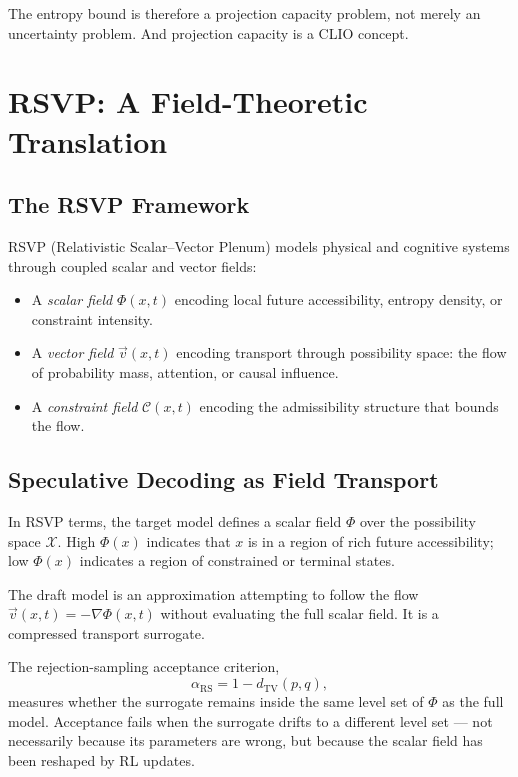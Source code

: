 \documentclass[11pt, a4paper, openany]{book}
\theoremstyle{plain}
\theoremstyle{definition}
\theoremstyle{remark}
\newcommand{\TV}{d_{\mathrm{TV}}}
\newcommand{\RS}{\alpha_{\mathrm{RS}}}
\begin{document}
The entropy bound is therefore a projection capacity problem,
not merely an uncertainty problem.
And projection capacity is a CLIO concept.

\chapter{RSVP: A Field-Theoretic Translation}
\label{ch:rsvp}

\section{The RSVP Framework}

RSVP (Relativistic Scalar--Vector Plenum) models physical and cognitive
systems through coupled scalar and vector fields:
\begin{itemize}
  \item A \emph{scalar field} $\Phi(x, t)$ encoding local future accessibility,
    entropy density, or constraint intensity.
  \item A \emph{vector field} $\vec{v}(x, t)$ encoding transport through
    possibility space: the flow of probability mass, attention, or causal influence.
  \item A \emph{constraint field} $\mathcal{C}(x, t)$ encoding the admissibility
    structure that bounds the flow.
\end{itemize}

\section{Speculative Decoding as Field Transport}

In RSVP terms, the target model defines a scalar field $\Phi$ over the
possibility space $\mathcal{X}$.
High $\Phi(x)$ indicates that $x$ is in a region of rich future accessibility;
low $\Phi(x)$ indicates a region of constrained or terminal states.

The draft model is an approximation attempting to follow the flow
$\vec{v}(x, t) = -\nabla\Phi(x, t)$ without evaluating the full scalar field.
It is a compressed transport surrogate.

The rejection-sampling acceptance criterion,
\[
  \RS = 1 - \TV(p, q),
\]
measures whether the surrogate remains inside the same level set of $\Phi$
as the full model.
Acceptance fails when the surrogate drifts to a different level set ---
not necessarily because its parameters are wrong, but because the scalar
field has been reshaped by RL updates.
\end{document}
